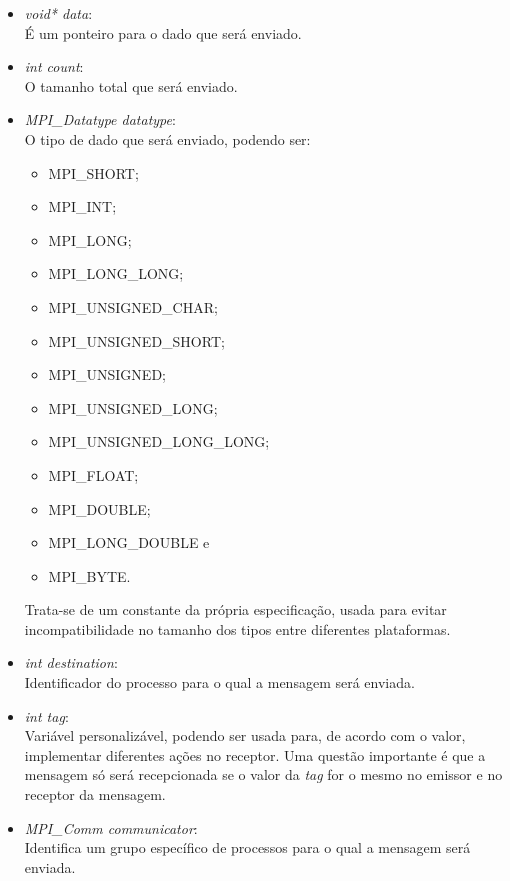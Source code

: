 			\begin{itemize}
				\item \textit{void* data}:\\
					É um ponteiro para o dado que será enviado.
				
				\item \textit{int count}:\\
					O tamanho total que será enviado.
					
				\item \textit{MPI\_Datatype datatype}:\\
					O tipo de dado que será enviado, podendo ser:
					\begin{itemize}
						\item MPI\_SHORT;
						\item MPI\_INT;
						\item MPI\_LONG;
						\item MPI\_LONG\_LONG;
						\item MPI\_UNSIGNED\_CHAR;
						\item MPI\_UNSIGNED\_SHORT;
						\item MPI\_UNSIGNED;
						\item MPI\_UNSIGNED\_LONG;
						\item MPI\_UNSIGNED\_LONG\_LONG;
						\item MPI\_FLOAT;
						\item MPI\_DOUBLE;
						\item MPI\_LONG\_DOUBLE e
						\item MPI\_BYTE.
					\end{itemize}
					Trata-se de um constante da própria especificação, usada para evitar incompatibilidade no tamanho dos tipos entre diferentes plataformas.
					
				\item \textit{int destination}:\\
					Identificador do processo para o qual a mensagem será enviada.
										
				\item \textit{int tag}:\\
					Variável personalizável, podendo ser usada para, de acordo com o valor, implementar diferentes ações no receptor. Uma questão importante é que a mensagem só será recepcionada se o valor da \textit{tag} for o mesmo no emissor e no receptor da mensagem.
					
				\item \textit{MPI\_Comm communicator}:\\
							Identifica um grupo específico de processos para o qual a mensagem será enviada.	
			\end{itemize}
			
